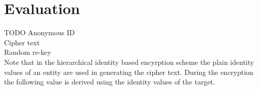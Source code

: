 \section{Evaluation}
TODO
Anonymous ID\\
Cipher text\\
Random re-key\\
Note that in the hierarchical identity based encyrption scheme \cite{BBG05} the plain identity values of an entity are used in generating the cipher text. During the encryption the following value is derived using the identity values of the target.

